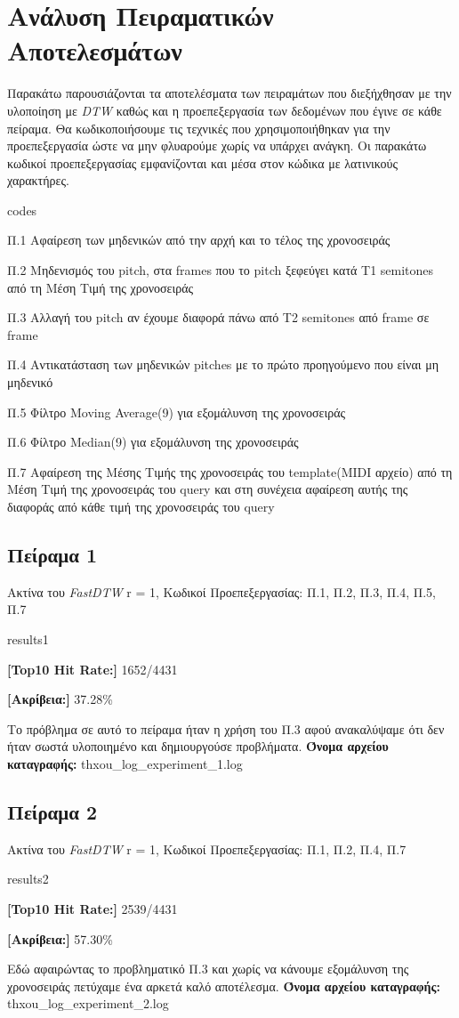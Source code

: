 \section{Ανάλυση Πειραματικών Αποτελεσμάτων}
Παρακάτω παρουσιάζονται τα αποτελέσματα των πειραμάτων που διεξήχθησαν με την υλοποίηση με \textit{DTW} καθώς και η προεπεξεργασία
των δεδομένων που έγινε σε κάθε πείραμα.
Θα κωδικοποιήσουμε τις τεχνικές που χρησιμοποιήθηκαν για την προεπεξεργασία ώστε να μην φλυαρούμε χωρίς
να υπάρχει ανάγκη. Οι παρακάτω κωδικοί προεπεξεργασίας εμφανίζονται και μέσα στον κώδικα με λατινικούς χαρακτήρες.
\begin{labeling}{codes}
	\item[Π.1] Αφαίρεση των μηδενικών από την αρχή και το τέλος της χρονοσειράς
	\item[Π.2] Μηδενισμός του pitch, στα frames που το pitch ξεφεύγει κατά T1 semitones από τη Μέση Τιμή της χρονοσειράς
	\item[Π.3] Αλλαγή του pitch αν έχουμε διαφορά πάνω από Τ2 semitones από frame σε frame
	\item[Π.4] Αντικατάσταση των μηδενικών pitches με το πρώτο προηγούμενο που είναι μη μηδενικό
	\item[Π.5] Φίλτρο Moving Average(9) για εξομάλυνση της χρονοσειράς
	\item[Π.6] Φίλτρο Median(9) για εξομάλυνση της χρονοσειράς
	\item[Π.7] Αφαίρεση της Μέσης Τιμής της χρονοσειράς του template(MIDI αρχείο) από τη Μέση Τιμή της χρονοσειράς του query και στη συνέχεια αφαίρεση αυτής της διαφοράς από κάθε τιμή της χρονοσειράς του query
\end{labeling}

\subsection{Πείραμα 1}
Ακτίνα του \textit{FastDTW} r = 1, Κωδικοί Προεπεξεργασίας: Π.1, Π.2, Π.3, Π.4, Π.5, Π.7
\begin{labeling}{results1}
	\item \textbf{[Top10 Hit Rate:]} 1652/4431
	\item \textbf{[Ακρίβεια:]} 37.28\%
\end{labeling}
Το πρόβλημα σε αυτό το πείραμα ήταν η χρήση του Π.3 αφού ανακαλύψαμε ότι δεν ήταν σωστά υλοποιημένο και δημιουργούσε προβλήματα.
\textbf{Όνομα αρχείου καταγραφής:} thxou\_log\_experiment\_1.log

\subsection{Πείραμα 2}
Ακτίνα του \textit{FastDTW} r = 1, Κωδικοί Προεπεξεργασίας: Π.1, Π.2, Π.4, Π.7
\begin{labeling}{results2}
	\item \textbf{[Top10 Hit Rate:]} 2539/4431
	\item \textbf{[Ακρίβεια:]} 57.30\%
\end{labeling}
Εδώ αφαιρώντας το προβληματικό Π.3 και χωρίς να κάνουμε εξομάλυνση της χρονοσειράς πετύχαμε ένα αρκετά καλό αποτέλεσμα.
\textbf{Όνομα αρχείου καταγραφής:} thxou\_log\_experiment\_2.log

